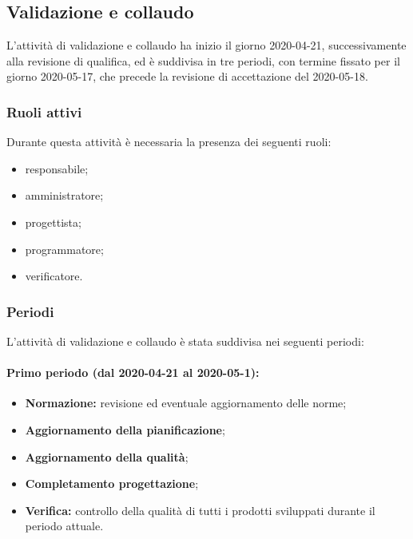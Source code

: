 		\subsection{Validazione e collaudo}	
		
			L'attività di validazione e collaudo ha inizio il giorno 2020-04-21, successivamente alla revisione di qualifica, ed è suddivisa in tre periodi, con termine fissato per il giorno 2020-05-17, che precede la revisione di accettazione del 2020-05-18.
			
			\subsubsection{Ruoli attivi}
			
			Durante questa attività è necessaria la presenza dei seguenti ruoli:
			\begin{itemize}
				\item responsabile;
				\item amministratore;
				\item progettista;
				\item programmatore;
				\item verificatore.
			\end{itemize}
			
			\subsubsection{Periodi}
			
				L'attività di validazione e collaudo è stata suddivisa nei seguenti periodi:
		
				\paragraph{Primo periodo (dal 2020-04-21 al 2020-05-1):}
			
					\begin{itemize}
						\item \textbf{Normazione:} revisione ed eventuale aggiornamento delle norme;
						\item \textbf{Aggiornamento della pianificazione};
						\item \textbf{Aggiornamento della qualità};
						\item \textbf{Completamento progettazione};
						\item \textbf{Verifica:} controllo della qualità di tutti i prodotti sviluppati durante il periodo attuale.
					\end{itemize} 	
				
